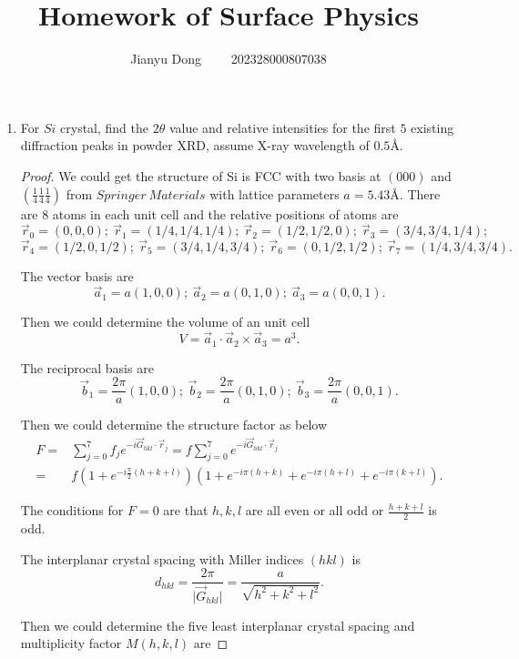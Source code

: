 \documentclass[reqno,a4paper,12pt]{amsart}
\title{Homework of Surface Physics}
\author{Jianyu Dong \ \ \ \ 202328000807038}
\begin{document}
\maketitle

\begin{enumerate}[1.]

\item For $Si$ crystal, find the $2\theta$ value and relative intensities for the first $5$ existing diffraction peaks in powder XRD, assume X-ray wavelength of $0.5$\AA.

\begin{proof}
	We could get the structure of Si is FCC with two basis at $(000)$ and $(\frac{1}{4}\frac{1}{4}\frac{1}{4})$ from $Springer \ Materials$ with lattice parameters $a = 5.43$\AA. There are $8$ atoms in each unit cell and the relative positions of atoms are 
	\[
		\vec{r}_0 = (0,0,0); \ \vec{r}_1 = (1/4, 1/4, 1/4); \ \vec{r}_2 = (1/2, 1/2, 0); \ \vec{r}_3 = (3/4, 3/4, 1/4); 
	\]
	\[
		\vec{r}_4 = (1/2, 0, 1/2); \ \vec{r}_5 = (3/4, 1/4, 3/4); \ \vec{r}_6 = (0, 1/2, 1/2); \ \vec{r}_7 = (1/4, 3/4, 3/4).
	\]
	
	The vector basis are 
	\[
		\vec{a}_1 = a(1,0,0); \ \vec{a}_2 = a(0,1,0); \ \vec{a}_3 = a(0,0,1).
	\]
	
	Then we could determine the volume of an unit cell
	\[
		V = \vec{a}_1 \cdot \vec{a}_2 \times \vec{a}_3 = a^3.
	\]
	
	The reciprocal basis are 
	\[
		\vec{b}_1 = \frac{2\pi}{a}(1,0,0); \ \vec{b}_2 = \frac{2\pi}{a}(0,1,0); \ \vec{b}_3 = \frac{2\pi}{a}(0,0,1).
	\]
	
	Then we could determine the structure factor as below 
	\begin{align*}
		F =& \sum_{j=0}^7 f_j e^{-i\vec{G}_{hkl}\cdot\vec{r}_j} = f \sum_{j=0}^7 e^{-i\vec{G}_{hkl}\cdot\vec{r}_j} \\
		=& f\left( 1+e^{-i\frac{\pi}{2}(h+k+l)} \right) \left( 1 + e^{-i\pi(h+k)} + e^{-i\pi(h+l)} + e^{-i\pi(k+l)} \right).
	\end{align*}

	The conditions for $F=0$ are that $h,k,l$ are all even or all odd or $\frac{h+k+l}{2}$ is odd.
	
	The interplanar crystal spacing with Miller indices $(hkl)$ is
	\[
		d_{hkl} = \frac{2\pi}{\vert \vec{G}_{hkl} \vert} = \frac{a}{\sqrt{h^2+k^2+l^2}}.
	\]
	
	Then we could determine the five least interplanar crystal spacing and multiplicity factor $M(h,k,l)$ are 
	

\end{proof}
\end{enumerate}
\end{document}
